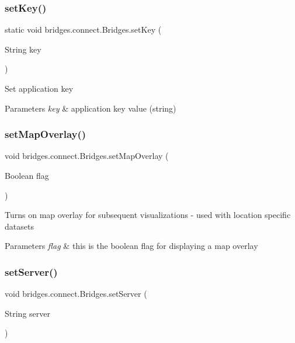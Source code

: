 \subsubsection{\texorpdfstring{set\+Key()}{setKey()}}
{\footnotesize\ttfamily static void bridges.\+connect.\+Bridges.\+set\+Key (\begin{DoxyParamCaption}\item[{String}]{key }\end{DoxyParamCaption})\hspace{0.3cm}{\ttfamily [static]}}

Set application key


\begin{DoxyParams}{Parameters}
{\em key} & application key value (string) \\
\hline
\end{DoxyParams}
\mbox{\label{classbridges_1_1connect_1_1_bridges_a4af383ba2f114ad7bd4e08eb44096973}} 
\subsubsection{\texorpdfstring{set\+Map\+Overlay()}{setMapOverlay()}}
{\footnotesize\ttfamily void bridges.\+connect.\+Bridges.\+set\+Map\+Overlay (\begin{DoxyParamCaption}\item[{Boolean}]{flag }\end{DoxyParamCaption})}

Turns on map overlay for subsequent visualizations -\/ used with location specific datasets


\begin{DoxyParams}{Parameters}
{\em flag} & this is the boolean flag for displaying a map overlay \\
\hline
\end{DoxyParams}
\mbox{\label{classbridges_1_1connect_1_1_bridges_ab43e412448e1dfc340e58c407519a576}} 
\subsubsection{\texorpdfstring{set\+Server()}{setServer()}}
{\footnotesize\ttfamily void bridges.\+connect.\+Bridges.\+set\+Server (\begin{DoxyParamCaption}\item[{String}]{server }\end{DoxyParamCaption})}


